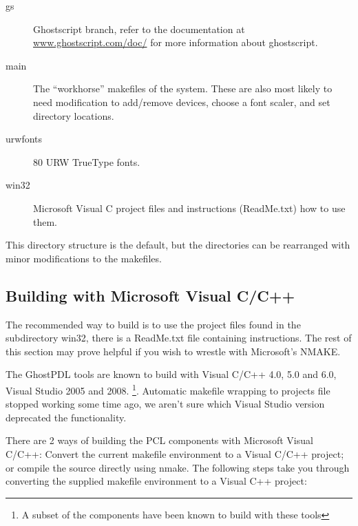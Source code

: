 \documentclass[10pt]{article}
\begin{document}
\begin{description}
\item[gs] Ghostscript branch, refer to the documentation at
  \url{www.ghostscript.com/doc/} for more information about
  ghostscript.
  
\item[main] The ``workhorse'' makefiles of the system.  These are also
  most likely to need modification to add/remove devices, choose a
  font scaler, and set directory locations.

\item[urwfonts] 80 URW TrueType fonts.

\item[win32] Microsoft Visual C project files and instructions (ReadMe.txt) how to use them.

\end{description}

This directory structure is the default, but the directories can be
rearranged with minor modifications to the makefiles.

\subsection*{Building with Microsoft Visual C/C++}

The recommended way to build is to use the project files found in the subdirectory win32, there is a ReadMe.txt file containing instructions.  The rest of this section may prove helpful if you wish to wrestle with Microsoft's NMAKE.
  
The GhostPDL tools are known to build with Visual C/C++ 4.0, 5.0 and 6.0, Visual Studio 2005 and 2008. \footnote{A subset of the components have been known to build with these tools}.  Automatic makefile wrapping to projects file stopped working some time ago, we aren't sure which Visual Studio version deprecated the functionality.

There are 2 ways of building the PCL components with Microsoft Visual
C/C++: Convert the current makefile environment to a Visual C/C++
project; or compile the source directly using nmake. The following
steps take you through converting the supplied makefile environment to
a Visual C++ project:
\end{document}
